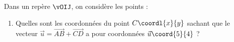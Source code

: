 \begin{exo}{}
	Dans un repère $\vOIJ$, on considère les points :
	\begin{enumerate}
		\item Quelles sont les coordonnées du point $C\coordl{x}{y}$ sachant que le vecteur $\vec{u} = \vec{AB} + \vec{CD}$ a pour coordonnées $\vec{u}\coord{5}{4}$ ?
	\end{enumerate}
\end{exo}

